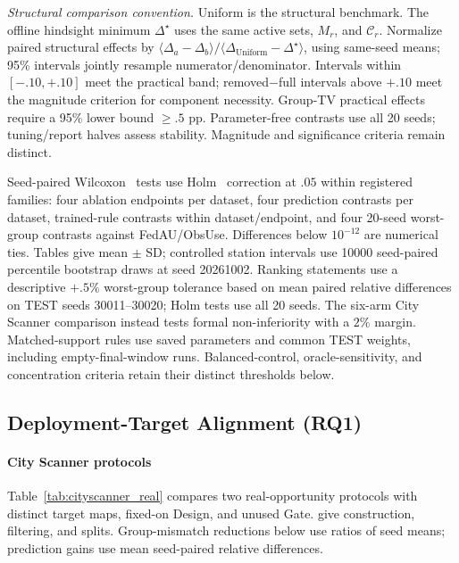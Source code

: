 \documentclass[letterpaper,journal]{IEEEtran}
\begin{document}
\noindent\textit{Structural comparison convention.}
\label{subsec:equivalence_band}
Uniform is the structural benchmark. The offline hindsight minimum $\Delta^\star$
uses the same active sets, $M_r$, and $\mathcal C_r$. Normalize paired structural
effects by $\langle\Delta_a-\Delta_b\rangle/
\langle\Delta_{\mathrm{Uniform}}-\Delta^\star\rangle$, using same-seed means;
95\% intervals jointly resample numerator/denominator. Intervals within
$[-.10,+.10]$ meet the practical band; removed$-$full intervals above $+.10$
meet the magnitude criterion for component necessity. Group-TV practical effects
require a 95\% lower bound $\ge.5$ pp. Parameter-free contrasts use all
20 seeds; tuning/report halves assess stability. Magnitude and significance
criteria remain distinct.

Seed-paired Wilcoxon~\cite{wilcoxon1945individual} tests use
Holm~\cite{holm1979simple} correction at $.05$ within registered families:
four ablation endpoints per dataset, four prediction contrasts per dataset,
trained-rule contrasts within dataset/endpoint, and four 20-seed worst-group
contrasts against FedAU/ObsUse.  Differences below $10^{-12}$ are numerical
ties.  Tables give mean $\pm$ SD; controlled station intervals use 10000
seed-paired percentile bootstrap draws at seed 20261002.  Ranking statements use a descriptive $+.5\%$ worst-group tolerance based on
mean paired relative differences on TEST seeds 30011--30020; Holm tests use
all 20 seeds. The six-arm City Scanner comparison instead tests formal
non-inferiority with a $2\%$ margin.
Matched-support rules use saved parameters and common TEST weights, including
empty-final-window runs. Balanced-control,
oracle-sensitivity, and concentration criteria retain their distinct thresholds below.

\subsection{Deployment-Target Alignment (RQ1)}
\label{subsec:rq1_alignment}
\label{subsec:eval_rq1}

\paragraph{City Scanner protocols}
\label{subsec:cityscanner_real}

Table~\ref{tab:cityscanner_real} compares two
real-opportunity protocols with distinct target maps, fixed-on Design, and unused Gate.  give construction, filtering, and splits.
Group-mismatch reductions below use ratios of seed means; prediction gains use mean
seed-paired relative differences.
\end{document}

